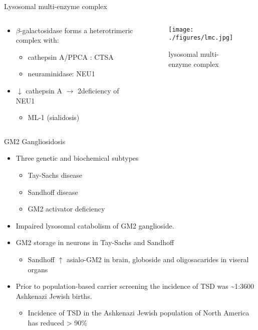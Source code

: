 \documentclass[presentation, smaller]{beamer}
\begin{document}
\begin{frame}[label={sec:orgheadline4}]{Lysosomal multi-enzyme complex}
\begin{columns}
\begin{column}{0.6\columnwidth}
\begin{itemize}
\item \(\beta\)-galactosidase forms a heterotrimeric complex with:
\begin{itemize}
\item cathepsin A/PPCA : CTSA
\item neuraminidase: NEU1
\end{itemize}

\item \(\downarrow\) cathepsin A \(\to\) 2\degree  deficiency of NEU1
\begin{itemize}
\item ML-1 (sialidosis)
\end{itemize}
\end{itemize}
\end{column}

\begin{column}{0.5\columnwidth}
\begin{figure}[htb]
\centering
\texttt{[image: ./figures/lmc.jpg]}
\caption[lmc]{\label{fig:lmc}
lysosomal multi-enzyme complex}
\end{figure}
\end{column}
\end{columns}
\end{frame}


\begin{frame}[label={sec:orgheadline5}]{GM2 Gangliosidosis}
\begin{itemize}
\item Three genetic and biochemical subtypes
\begin{itemize}
\item Tay-Sachs disease
\item Sandhoff disease
\item GM2 activator deficiency
\end{itemize}
\item Impaired lysosomal catabolism of GM2 ganglioside.
\item GM2 storage in neurons in Tay-Sachs and Sandhoff
\begin{itemize}
\item Sandhoff \(\uparrow\) asialo-GM2 in brain, globoside and oligosacarides in viseral organs
\end{itemize}
\item Prior to population-based carrier screening the incidence of TSD was \textasciitilde{}1:3600 Ashkenazi Jewish births.
\begin{itemize}
\item Incidence of TSD in the Ashkenazi Jewish population of North America has reduced > 90\%
\end{itemize}
\end{itemize}
\end{frame}
\end{document}
